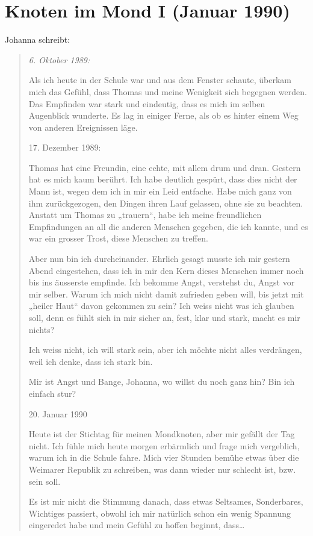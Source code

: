 \documentclass[10pt,a5paper]{book}
\newenvironment{tg}{\begin{quote}\em}{\end{quote}}
\begin{document}
\section*{Knoten im Mond I (Januar 1990)}




Johanna schreibt:
\begin{tg}
6. Oktober 1989:

Als ich heute in der Schule war und aus dem Fenster schaute, überkam mich das Gefühl, dass Thomas und meine Wenigkeit sich begegnen werden. Das Empfinden war stark und eindeutig, dass es mich im selben Augenblick wunderte. Es lag in einiger Ferne, als ob es hinter einem Weg von anderen Ereignissen läge.

17. Dezember 1989:

Thomas hat eine Freundin, eine echte, mit allem drum und dran. Gestern hat es mich kaum berührt. Ich habe deutlich gespürt, dass dies nicht der Mann ist, wegen dem ich in mir ein Leid entfache. Habe mich ganz von ihm zurückgezogen, den Dingen ihren Lauf gelassen, ohne sie zu beachten. Anstatt um Thomas zu „trauern“, habe ich meine freundlichen Empfindungen an all die anderen Menschen gegeben, die ich kannte, und es war ein grosser Trost, diese Menschen zu treffen.

Aber nun bin ich durcheinander. Ehrlich gesagt musste ich mir gestern Abend eingestehen, dass ich in mir den Kern dieses Menschen immer noch bis ins äusserste empfinde. Ich bekomme Angst, verstehst du, Angst vor mir selber. Warum ich mich nicht damit zufrieden geben will, bis jetzt mit „heiler Haut“ davon gekommen zu sein? Ich weiss nicht was ich glauben soll, denn es fühlt sich in mir sicher an, fest, klar und stark, macht es mir nichts?

Ich weiss nicht, ich will stark sein, aber ich möchte nicht alles verdrängen, weil ich denke, dass ich stark bin.

Mir ist Angst und Bange, Johanna, wo willst du noch ganz hin?
Bin ich einfach stur?

20. Januar 1990

Heute ist der Stichtag für meinen Mondknoten, aber mir gefällt der Tag nicht. Ich fühle mich heute morgen erbärmlich und frage mich vergeblich, warum ich in die Schule fahre. Mich vier Stunden bemühe etwas über die Weimarer Republik zu schreiben, was dann wieder nur schlecht ist, bzw. sein soll.

Es ist mir nicht die Stimmung danach, dass etwas Seltsames, Sonderbares, Wichtiges passiert, obwohl ich mir natürlich schon ein wenig Spannung eingeredet habe und mein Gefühl zu hoffen beginnt, dass\dots 


\end{tg}
\end{document}
